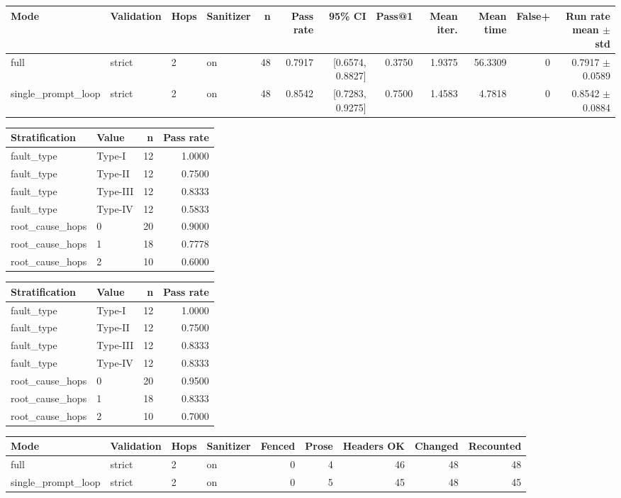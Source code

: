 \begin{table}[ht]
\centering
\begin{tabular}{llllrrrrrrrr}
Mode & Validation & Hops & Sanitizer & n & Pass rate & 95\% CI & Pass@1 & Mean iter. & Mean time & False+ & Run rate mean $\pm$ std \\
\hline
full & strict & 2 & on & 48 & 0.7917 & [0.6574, 0.8827] & 0.3750 & 1.9375 & 56.3309 & 0 & 0.7917 $\pm$ 0.0589 \\
single\_prompt\_loop & strict & 2 & on & 48 & 0.8542 & [0.7283, 0.9275] & 0.7500 & 1.4583 & 4.7818 & 0 & 0.8542 $\pm$ 0.0884 \\
\end{tabular}
\end{table}
\begin{table}[ht]
\centering
\begin{tabular}{llrr}
Stratification & Value & n & Pass rate \\
\hline
fault_type & Type-I & 12 & 1.0000 \\
fault_type & Type-II & 12 & 0.7500 \\
fault_type & Type-III & 12 & 0.8333 \\
fault_type & Type-IV & 12 & 0.5833 \\
root_cause_hops & 0 & 20 & 0.9000 \\
root_cause_hops & 1 & 18 & 0.7778 \\
root_cause_hops & 2 & 10 & 0.6000 \\
\end{tabular}
\end{table}
\begin{table}[ht]
\centering
\begin{tabular}{llrr}
Stratification & Value & n & Pass rate \\
\hline
fault_type & Type-I & 12 & 1.0000 \\
fault_type & Type-II & 12 & 0.7500 \\
fault_type & Type-III & 12 & 0.8333 \\
fault_type & Type-IV & 12 & 0.8333 \\
root_cause_hops & 0 & 20 & 0.9500 \\
root_cause_hops & 1 & 18 & 0.8333 \\
root_cause_hops & 2 & 10 & 0.7000 \\
\end{tabular}
\end{table}
\begin{table}[ht]
\centering
\begin{tabular}{llllrrrrr}
Mode & Validation & Hops & Sanitizer & Fenced & Prose & Headers OK & Changed & Recounted \\
\hline
full & strict & 2 & on & 0 & 4 & 46 & 48 & 48 \\
single\_prompt\_loop & strict & 2 & on & 0 & 5 & 45 & 48 & 45 \\
\end{tabular}
\end{table}
